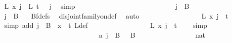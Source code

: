 \begin{isabellebody}
\ {\isacartoucheopen}L{\isacharprime}{\kern0pt}\ x\ j\ {\isacharequal}{\kern0pt}\ L\ {\isacharparenleft}{\kern0pt}t\ {\isacharminus}{\kern0pt}\ {}{\isacharparenright}{\kern0pt}\ j{\isacartoucheclose}\ \isamarkupfalse%
\ simp\isanewline
\ \ \ \ \ \ \ \ \ \ \ \ \isamarkupfalse%
\isanewline
\ \ \ \ \ \ \ \ \ \ \ \ \ \ \isamarkupfalse%
\ {\isachardoublequoteopen}j\ {\isasymin}\ B\ {}{\isachardoublequoteclose}\isanewline
\ \ \ \ \ \ \ \ \ \ \ \ \ \ \isamarkupfalse%
\ \isamarkupfalse%
\ {\isachardoublequoteopen}j\ {\isasymnotin}\ B\ {}{\isachardoublequoteclose}\ \isamarkupfalse%
\ Bf{\isacharunderscore}{\kern0pt}defs\ \isamarkupfalse%
\ disjoint{\isacharunderscore}{\kern0pt}family{\isacharunderscore}{\kern0pt}on{\isacharunderscore}{\kern0pt}def\ \isamarkupfalse%
\ auto\isanewline
\ \ \ \ \ \ \ \ \ \ \ \ \ \ \isamarkupfalse%
\ \isamarkupfalse%
\ {\isachardoublequoteopen}L{\isacharprime}{\kern0pt}\ x\ j\ {\isacharequal}{\kern0pt}\ t{\isachardoublequoteclose}\ \ \isamarkupfalse%
\ {\isacharparenleft}{\kern0pt}simp\ add{\isacharcolon}{\kern0pt}\ {\isacartoucheopen}j\ {\isasymin}\ B\ {}{\isacartoucheclose}\ {\isacartoucheopen}x\ {\isacharequal}{\kern0pt}\ t{\isacartoucheclose}\ L{\isacharprime}{\kern0pt}{\isacharunderscore}{\kern0pt}def{\isacharparenright}{\kern0pt}\isanewline
\ \ \ \ \ \ \ \ \ \ \ \ \ \ \isamarkupfalse%
\ \isamarkupfalse%
\ {\isachardoublequoteopen}L{\isacharprime}{\kern0pt}\ x\ j\ {\isasymin}\ {\isacharbraceleft}{\kern0pt}{\isachardot}{\kern0pt}{\isachardot}{\kern0pt}{\isacharless}{\kern0pt}t\ {\isacharplus}{\kern0pt}\ {}{\isacharbraceright}{\kern0pt}{\isachardoublequoteclose}\ \isamarkupfalse%
\ simp\isanewline
\ \ \ \ \ \ \ \ \ \ \ \ \isamarkupfalse%
\isanewline
\ \ \ \ \ \ \ \ \ \ \ \ \ \ \isamarkupfalse%
\ a{\isacharcolon}{\kern0pt}\ {\isachardoublequoteopen}j\ {\isasymnotin}\ {\isacharparenleft}{\kern0pt}B\ {}\ {\isasymunion}\ B\ {}{\isacharparenright}{\kern0pt}{\isachardoublequoteclose}\isanewline
\ \ \ \ \ \ \ \ \ \ \ \ \ \ \isamarkupfalse%
\ {\isachardoublequoteopen}{\isacharbraceleft}{\kern0pt}{\isachardot}{\kern0pt}{\isachardot}{\kern0pt}{}{\isacharcolon}{\kern0pt}{\isacharcolon}{\kern0pt}nat{\isacharbraceright}{\kern0pt}\ {\isacharequal}{\kern0pt}\ {\isacharbraceleft}{\kern0pt}{}{\isacharcomma}{\kern0pt}\ {}{\isacharbraceright}{\kern0pt}{\isachardoublequoteclose}\ \isamarkupfalse%

\end{isabellebody}
